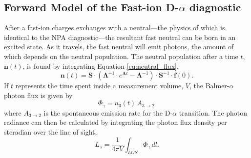 \subsection{Forward Model of the Fast-ion D-$\alpha$ diagnostic}
After a fast-ion charges exchanges with a neutral---the physics of which is identical to the NPA diagnostic---the resultant fast neutral can be born in an excited state. As it travels, the fast neutral will emit photons, the amount of which depends on the neutral population.
The neutral population after a time $t$, $\mathbf{n}(t)$, is found by integrating Equation \ref{eq:neutral_flux},
\begin{equation}\label{eq:neutral_population}
    \mathbf{n}(t) = \mathbf{S} \cdot ( \mathbf{\Lambda}^{-1} \cdot e^{\mathbf{\Lambda} t} - \mathbf{\Lambda}^{-1} ) \cdot \mathbf{S}^{-1} \cdot \mathbf{f}(0).
\end{equation}
If $t$ represents the time spent inside a measurement volume, $V$, the Balmer-$\alpha$ photon flux is given by
\begin{equation}\label{eq:photon_flux}
    \Phi_\gamma = n_{3}(t)\,A_{3 \rightarrow 2}\,
\end{equation}
where $A_{3\rightarrow2}$ is the spontaneous emission rate for the D-$\alpha$ transition.
The photon radiance can then be calculated by integrating the photon flux density per steradian over the line of sight,
\begin{equation}\label{eq:photon_radiance}
    L_\gamma = \frac{1}{4\pi V} \int_{LOS} \Phi_\gamma\, dl .
\end{equation}

